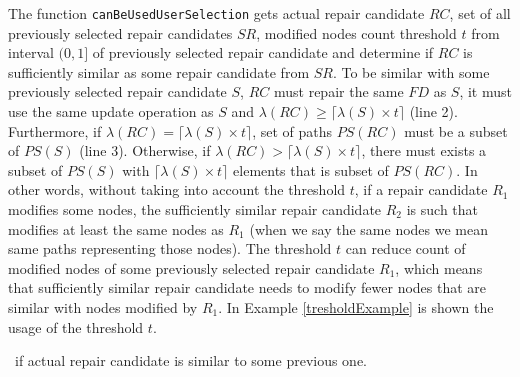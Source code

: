The function \texttt{canBeUsedUserSelection} gets actual repair candidate $RC$, set of all previously selected repair candidates $SR$, modified nodes count threshold $t$ from interval $(0,1]$ of previously selected repair candidate and determine if $RC$ is sufficiently similar as some repair candidate from $SR$. To be similar with some previously selected repair candidate $S$, $RC$ must repair the same $FD$ as $S$, it must use the same update operation as $S$ and $\lambda(RC) \geq \lceil\lambda(S) \times t\rceil$ (line 2). Furthermore, if $\lambda(RC) = \lceil\lambda(S) \times t\rceil$, set of paths $PS(RC)$ must be a subset of $PS(S)$ (line 3). Otherwise, if $\lambda(RC) > \lceil\lambda(S) \times t\rceil$, there must exists a subset of $PS(S)$ with $\lceil\lambda(S) \times t\rceil$ elements that is subset of $PS(RC)$. In other words, without taking into account the threshold $t$, if a repair candidate $R_1$ modifies some nodes, the sufficiently similar repair candidate $R_2$ is such that modifies at least the same nodes as $R_1$ (when we say the same nodes we mean same paths representing those nodes). The threshold $t$ can reduce count of modified nodes of some previously selected repair candidate $R_1$, which means that sufficiently similar repair candidate needs to modify fewer nodes that are similar with nodes modified by $R_1$. In Example \ref{tresholdExample} is shown the usage of the threshold $t$.


\begin{algorithm}
\caption{$canBeUsedUserSelection(SR, t, RC)$}
\label{canUserSel}
\begin{algorithmic}[1]
\REQUIRE{\ \\
$SR$: set of previously selected repair candidates by the user\\
$t$: suitability threshold $(0,1]$ of previously selected repair candidates\\
$RC$: actual repair candidate}
\ENSURE \TRUE\ if actual repair candidate is similar to some previous one.
            \RETURN \TRUE
        \ENDIF
            \RETURN \TRUE
        \ENDIF
   \ENDIF
\ENDFOR
\RETURN \FALSE
\end{algorithmic}
\end{algorithm}

